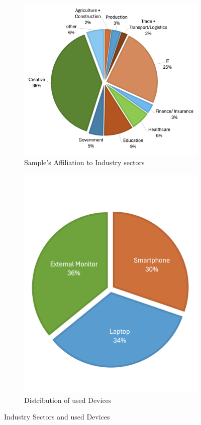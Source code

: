 \documentclass[
  a4paper,  %
  twoside,  %
  bibliography=totoc,
  headsepline,
  cleardoublepage=empty,
  parskip=half,
  draft=false
]{scrbook}
\begin{document}
\begin{figure}[h]
  \centering
  \begin{subfigure}{0.58\textwidth}
    \includegraphics[width=\linewidth]{graphics/statistics/piechart-sectors.png}
    \caption{Sample's Affiliation to Industry sectors}
    \label{fig:piechart-sectors}
  \end{subfigure}
  \begin{subfigure}{0.38\textwidth}
    \includegraphics[width=\linewidth]{graphics/statistics/piechart-devices.png}
    \caption{Distribution of used Devices}
    \label{fig:piechart-devices}
  \end{subfigure}
  \caption{Industry Sectors and used Devices}
\end{figure}
\end{document}

